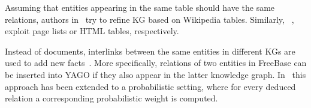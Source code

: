 Assuming that entities appearing in the same table should have the same relations, authors in~\cite{ref20} try to refine KG based on Wikipedia tables. Similarly, ~\cite{ref21}, ~\cite{ref22} exploit page lists or HTML tables, respectively.

Instead of documents, interlinks between the same entities in different KGs are used to add new facts~\cite{ref23, ref24}. More specifically, relations of two entities in FreeBase can be inserted into YAGO if they also appear in the latter knowledge graph. In~\cite{ref25} this approach has been extended to a probabilistic setting, where for every deduced relation a corresponding probabilistic weight is computed.
